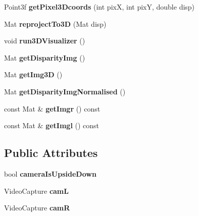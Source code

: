 \begin{DoxyCompactItemize}
\item 
Point3f {\bfseries get\+Pixel3\+Dcoords} (int pixX, int pixY, double disp)\hypertarget{class_stereo_pair_af6e3a2494fc0d9575f13537d735375b9}{}\label{class_stereo_pair_af6e3a2494fc0d9575f13537d735375b9}

\item 
Mat {\bfseries reproject\+To3D} (Mat disp)\hypertarget{class_stereo_pair_a0ed4c93839a57d44ee7a5d1b51a80fba}{}\label{class_stereo_pair_a0ed4c93839a57d44ee7a5d1b51a80fba}

\item 
void {\bfseries run3\+D\+Visualizer} ()\hypertarget{class_stereo_pair_a40235a1b5cce46b9674243ef420a1677}{}\label{class_stereo_pair_a40235a1b5cce46b9674243ef420a1677}

\item 
Mat {\bfseries get\+Disparity\+Img} ()\hypertarget{class_stereo_pair_a32abdceb241b127b6dfcea9a1ce1c359}{}\label{class_stereo_pair_a32abdceb241b127b6dfcea9a1ce1c359}

\item 
Mat {\bfseries get\+Img3D} ()\hypertarget{class_stereo_pair_a72960e78309b133895aac354c02ead57}{}\label{class_stereo_pair_a72960e78309b133895aac354c02ead57}

\item 
Mat {\bfseries get\+Disparity\+Img\+Normalised} ()\hypertarget{class_stereo_pair_a7467f9a0d1a77000e7f090877db07b88}{}\label{class_stereo_pair_a7467f9a0d1a77000e7f090877db07b88}

\item 
const Mat \& {\bfseries get\+Imgr} () const \hypertarget{class_stereo_pair_ae18e565f36644bd07e8e22bca2a38a0f}{}\label{class_stereo_pair_ae18e565f36644bd07e8e22bca2a38a0f}

\item 
const Mat \& {\bfseries get\+Imgl} () const \hypertarget{class_stereo_pair_af9c9bf0dff5f3c83dfac29fc96ad7530}{}\label{class_stereo_pair_af9c9bf0dff5f3c83dfac29fc96ad7530}

\end{DoxyCompactItemize}
\subsection*{Public Attributes}
\begin{DoxyCompactItemize}
\item 
bool {\bfseries camera\+Is\+Upside\+Down}\hypertarget{class_stereo_pair_a198303d06346053a0b3b3705f7e2c039}{}\label{class_stereo_pair_a198303d06346053a0b3b3705f7e2c039}

\item 
Video\+Capture {\bfseries camL}\hypertarget{class_stereo_pair_ada099b5df4882633945b71bbca72671c}{}\label{class_stereo_pair_ada099b5df4882633945b71bbca72671c}

\item 
Video\+Capture {\bfseries camR}\hypertarget{class_stereo_pair_acff1d2626cf09178f368670ba6c68ed1}{}\label{class_stereo_pair_acff1d2626cf09178f368670ba6c68ed1}

\end{DoxyCompactItemize}
